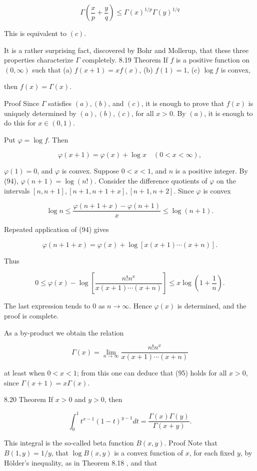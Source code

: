 \documentclass[10pt]{article}
\begin{document}
$$
\Gamma\left(\frac{x}{p}+\frac{y}{q}\right) \leq \Gamma(x)^{1 / p} \Gamma(y)^{1 / q}
$$

This is equivalent to $(c)$.

It is a rather surprising fact, discovered by Bohr and Mollerup, that these three properties characterize $\Gamma$ completely. 8.19 Theorem If $f$ is a positive function on $(0, \infty)$ such that
(a) $f(x+1)=x f(x)$,
(b) $f(1)=1$,
(c) $\log f$ is convex,

then $f(x)=\Gamma(x)$.

Proof Since $\Gamma$ satisfies $(a),(b)$, and $(c)$, it is enough to prove that $f(x)$ is uniquely determined by $(a),(b),(c)$, for all $x>0$. By $(a)$, it is enough to do this for $x \in(0,1)$.

Put $\varphi=\log f$. Then

$$
\varphi(x+1)=\varphi(x)+\log x \quad(0<x<\infty),
$$

$\varphi(1)=0$, and $\varphi$ is convex. Suppose $0<x<1$, and $n$ is a positive integer. By (94), $\varphi(n+1)=\log (n !)$. Consider the difference quotients of $\varphi$ on the intervals $[n, n+1],[n+1, n+1+x],[n+1, n+2]$. Since $\varphi$ is convex

$$
\log n \leq \frac{\varphi(n+1+x)-\varphi(n+1)}{x} \leq \log (n+1) .
$$

Repeated application of (94) gives

$$
\varphi(n+1+x)=\varphi(x)+\log [x(x+1) \cdots(x+n)] .
$$

Thus

$$
0 \leq \varphi(x)-\log \left[\frac{n ! n^{x}}{x(x+1) \cdots(x+n)}\right] \leq x \log \left(1+\frac{1}{n}\right) .
$$

The last expression tends to 0 as $n \rightarrow \infty$. Hence $\varphi(x)$ is determined, and the proof is complete.

As a by-product we obtain the relation

$$
\Gamma(x)=\lim _{n \rightarrow \infty} \frac{n ! n^{x}}{x(x+1) \cdots(x+n)}
$$

at least when $0<x<1$; from this one can deduce that (95) holds for all $x>0$, since $\Gamma(x+1)=x \Gamma(x)$.

8.20 Theorem If $x>0$ and $y>0$, then

$$
\int_{0}^{1} t^{x-1}(1-t)^{y-1} d t=\frac{\Gamma(x) \Gamma(y)}{\Gamma(x+y)} .
$$

This integral is the so-called beta function $B(x, y)$. Proof Note that $B(1, y)=1 / y$, that $\log B(x, y)$ is a convex function of $x$, for each fixed $y$, by Hölder's inequality, as in Theorem 8.18 , and that
\end{document}
